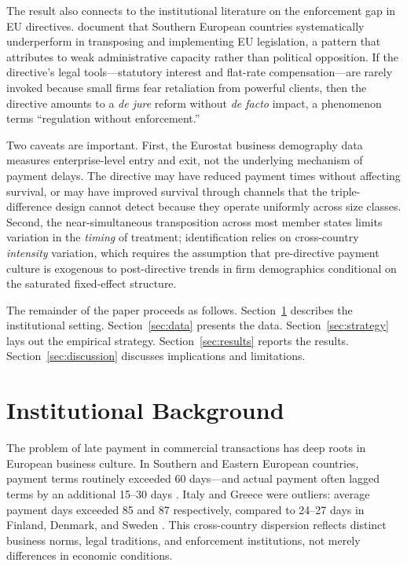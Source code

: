 \documentclass[12pt]{article}
\begin{document}
The result also connects to the institutional literature on the enforcement gap in EU directives. \citet{Falkner2005} document that Southern European countries systematically underperform in transposing and implementing EU legislation, a pattern that \citet{Treib2014} attributes to weak administrative capacity rather than political opposition. If the directive's legal tools---statutory interest and flat-rate compensation---are rarely invoked because small firms fear retaliation from powerful clients, then the directive amounts to a \emph{de jure} reform without \emph{de facto} impact, a phenomenon \citet{Meagher2008} terms ``regulation without enforcement.''

Two caveats are important. First, the Eurostat business demography data measures enterprise-level entry and exit, not the underlying mechanism of payment delays. The directive may have reduced payment times without affecting survival, or may have improved survival through channels that the triple-difference design cannot detect because they operate uniformly across size classes. Second, the near-simultaneous transposition across most member states limits variation in the \emph{timing} of treatment; identification relies on cross-country \emph{intensity} variation, which requires the assumption that pre-directive payment culture is exogenous to post-directive trends in firm demographics conditional on the saturated fixed-effect structure.

The remainder of the paper proceeds as follows. Section~\ref{sec:background} describes the institutional setting. Section~\ref{sec:data} presents the data. Section~\ref{sec:strategy} lays out the empirical strategy. Section~\ref{sec:results} reports the results. Section~\ref{sec:discussion} discusses implications and limitations.


\section{Institutional Background}
\label{sec:background}

The problem of late payment in commercial transactions has deep roots in European business culture. In Southern and Eastern European countries, payment terms routinely exceeded 60 days---and actual payment often lagged terms by an additional 15--30 days \citep{Intrum2012}. Italy and Greece were outliers: average payment days exceeded 85 and 87 respectively, compared to 24--27 days in Finland, Denmark, and Sweden \citep{Intrum2012}. This cross-country dispersion reflects distinct business norms, legal traditions, and enforcement institutions, not merely differences in economic conditions.
\end{document}
